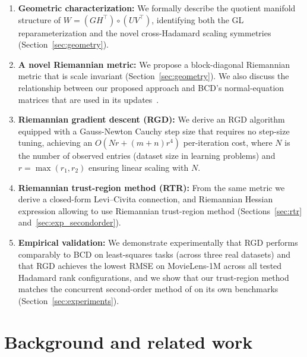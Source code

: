 \documentclass[letterpaper, 10 pt, conference]{ieeeconf}
\newcommand{\Had}{\circ}
\theoremstyle{plain}
\theoremstyle{definition}
\theoremstyle{remark}
\begin{document}
\begin{enumerate}[nosep]
\item \textbf{Geometric characterization:} We formally describe the quotient manifold structure of $W = (GH^\top)\Had(UV^\top)$, identifying both the GL reparameterization and the novel cross-Hadamard scaling symmetries (Section~\ref{sec:geometry}).
\item \textbf{A novel Riemannian metric:} We propose a block-diagonal Riemannian metric that is scale invariant (Section~\ref{sec:geometry}). We also discuss the relationship between our proposed approach and BCD's normal-equation matrices that are used in its updates~\cite{wertz2024bcd}.

\item \textbf{Riemannian gradient descent (RGD):} We derive an RGD algorithm equipped with a Gauss-Newton Cauchy step size that requires no step-size tuning, achieving an $O(Nr + (m{+}n)r^4)$ per-iteration cost, where $N$ is the number of observed entries (dataset size in learning problems) and $r = \max(r_1,r_2)$ ensuring linear scaling with $N$.

\item \textbf{Riemannian trust-region method (RTR):} From the same metric we derive a closed-form Levi--Civita connection, and Riemannian Hessian expression allowing to use Riemannian trust-region method (Sections~\ref{sec:rtr} and~\ref{sec:exp_secondorder}).

\item \textbf{Empirical validation:} We demonstrate experimentally that RGD performs comparably to BCD on least-squares tasks (across three real datasets) and that RGD achieves the lowest RMSE on MovieLens-1M across all tested Hadamard rank configurations, and we show that our trust-region method matches the concurrent second-order method of \citet{gillis2026manifold} on its own benchmarks (Section~\ref{sec:experiments}).
\end{enumerate}

\section{Background and related work}
\label{sec:related}
\end{document}
